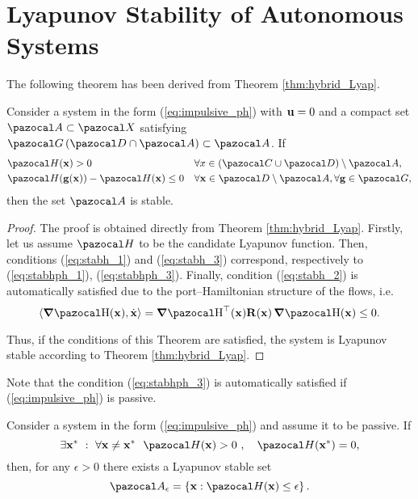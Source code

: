 \section{Lyapunov Stability of Autonomous Systems}
%
The following theorem has been derived from Theorem \ref{thm:hybrid_Lyap}.
%
\begin{thm}\label{thm:impulsive_lyap}
    Consider a system in the form (\ref{eq:impulsive_ph}) with $\mathbf{u} = 0$ and a compact set $\A\subset\X$ satisfying $\G\left(\D\cap\A\right)\subset\A$. If
	\begin{subequations}
		\begin{align}
		&\Ha(\xb)>0&&\forall x\in \left(\C\cup\D\right)\setminus\A\label{eq:stabhph_1},\\
		&\Ha(\gb(\xb)) - \Ha(\xb)\leq 0 &&\forall \xb\in\D\setminus\A,\forall \gb\in\G\label{eq:stabhph_3},
		\end{align}
	\end{subequations}
	then the set $\A$ is stable.
\end{thm}
%
\begin{proof}
    The proof is obtained directly from Theorem \ref{thm:hybrid_Lyap}. Firstly, let us assume $\Ha$ to be the candidate Lyapunov function. Then, conditions (\ref{eq:stabh_1}) and (\ref{eq:stabh_3}) correspond, respectively to (\ref{eq:stabhph_1}), (\ref{eq:stabhph_3}). Finally, condition (\ref{eq:stabh_2}) is automatically satisfied due to the port--Hamiltonian structure of the flows, i.e.
    \begin{equation}
        \langle\dH(\xb),\dot{\xb}\rangle = \dH^\top(\xb)\Rb(\xb)\dH(\xb)\leq 0.
    \end{equation}
    
    Thus, if the conditions of this Theorem are satisfied, the system is Lyapunov stable according to Theorem \ref{thm:hybrid_Lyap}. 
\end{proof}
%
Note that the condition (\ref{eq:stabhph_3}) is automatically satisfied if (\ref{eq:impulsive_ph}) is passive.
%
\begin{cor}\label{cor:impulsive_lyap}
	Consider a system in the form (\ref{eq:impulsive_ph}) and assume it to be passive. If
	\begin{equation}
	\exists \xb^*~:~\forall \xb\neq \xb^*~~\Ha(\xb)>0\text{ },\quad\Ha(\xb^*) = 0,
	\end{equation}
	then, for any $\epsilon>0$ there exists a Lyapunov stable set
	\begin{equation}
		\A_\epsilon = \left\{\xb:\Ha(\xb)\leq\epsilon\right\}.
	\end{equation}
\end{cor}
